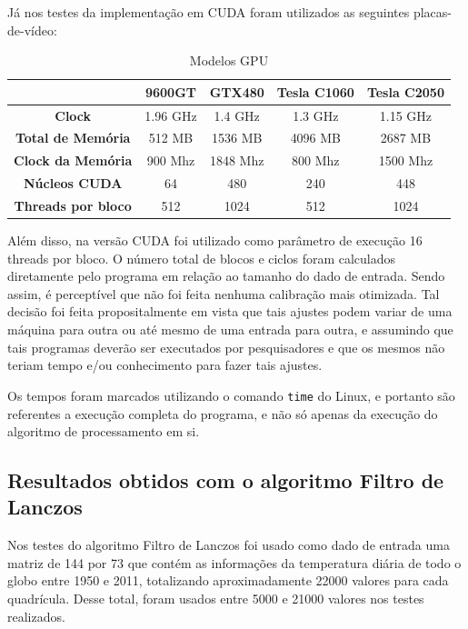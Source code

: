 Já nos testes da implementação em CUDA foram utilizados as seguintes placas-de-vídeo:

\begin{table}[H]
\caption{Modelos GPU}
\begin{center}
\begin{tabular}{ccccc}
 & \textbf{9600GT} & \textbf{GTX480} & \textbf{Tesla C1060} & \textbf{Tesla C2050}\\
\hline\hline
\textbf{Clock}				& 1.96 GHz	& 1.4 GHz 	& 1.3 GHz	& 1.15 GHz \\
\textbf{Total de Memória}		& 512 MB		& 1536 MB	& 4096 MB	& 2687 MB \\
\textbf{Clock da Memória}	& 900 Mhz	& 1848 Mhz 	& 800 Mhz	& 1500 Mhz \\
\textbf{Núcleos CUDA}		& 64			& 480		& 240		& 448 \\
\textbf{Threads por bloco}	& 512		& 1024		& 512		& 1024
\end{tabular} 
\end{center}
\end{table}

Além disso, na versão CUDA foi utilizado como parâmetro de execução 16 threads por bloco. O número total de blocos e ciclos foram calculados diretamente pelo programa em relação ao tamanho do dado de entrada. Sendo assim, é perceptível que não foi feita nenhuma calibração mais otimizada. Tal decisão foi feita propositalmente em vista que tais ajustes podem variar de uma máquina para outra ou até mesmo de uma entrada para outra, e assumindo que tais programas deverão ser executados por pesquisadores e que os mesmos não teriam tempo e/ou conhecimento para fazer tais ajustes.

Os tempos foram marcados utilizando o comando \texttt{time} do Linux, e portanto são referentes a execução completa do programa, e não só apenas da execução do algoritmo de processamento em si.

\subsection{Resultados obtidos com o algoritmo Filtro de Lanczos}

Nos testes do algoritmo Filtro de Lanczos foi usado como dado de entrada uma matriz de 144 por 73 que contém as informações da temperatura diária de todo o globo entre 1950 e 2011, totalizando aproximadamente 22000 valores para cada quadrícula. Desse total, foram usados entre 5000 e 21000 valores nos testes realizados.

